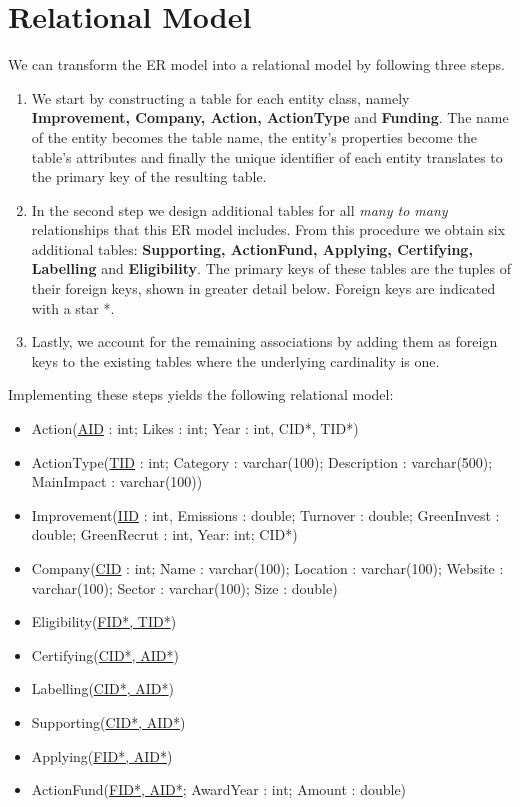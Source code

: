 \section{Relational Model} \label{sec:relational}

We can transform the ER model into a relational model by following three steps.
\begin{enumerate}
    \item We start by constructing a table for each entity class, namely \textbf{Improvement, Company, Action, ActionType}
    and \textbf{Funding}.
    The name of the entity becomes the table name, the entity's properties become the table's attributes and finally
    the unique identifier of each entity translates to the primary key of the resulting table.
    \item In the second step we design additional tables for all \textit{many to many} relationships that this ER model
    includes.
    From this procedure we obtain six additional tables: \textbf{Supporting, ActionFund, Applying, Certifying, Labelling}
    and \textbf{Eligibility}.
    The primary keys of these tables are the tuples of their foreign keys, shown in greater detail below.
    Foreign keys are indicated with a star *.
    \item Lastly, we account for the remaining associations by adding them as foreign keys to the existing tables where
    the underlying cardinality is one.
\end{enumerate}

Implementing these steps yields the following relational model:

\begin{itemize}
    \item Action(\underline{AID} : int; Likes : int; Year : int, CID*, TID*)
    \item ActionType(\underline{TID} : int; Category : varchar(100); Description : varchar(500); MainImpact : varchar(100))
    \item Improvement(\underline{IID} : int, Emissions : double; Turnover : double; GreenInvest : double; GreenRecrut : int, Year: int; CID*)
    \item Company(\underline{CID} : int; Name : varchar(100); Location : varchar(100); Website : varchar(100); Sector : varchar(100); Size : double)
    \item Eligibility(\underline{FID*, TID*})
    \item Certifying(\underline{CID*, AID*})
    \item Labelling(\underline{CID*, AID*})
    \item Supporting(\underline{CID*, AID*})
    \item Applying(\underline{FID*, AID*})
    \item ActionFund(\underline{FID*, AID*}; AwardYear : int; Amount : double)
\end{itemize}

